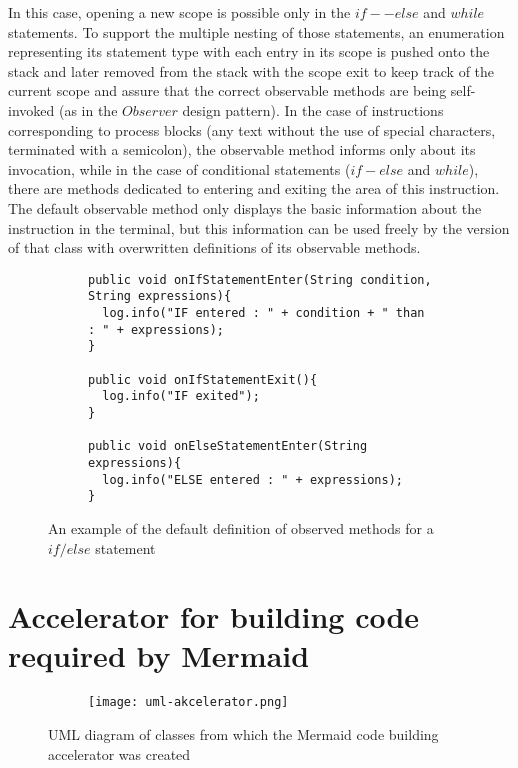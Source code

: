 In this case, opening a new scope is possible only in the $if -- else$ and $while$ statements. To support the multiple nesting of those statements, an enumeration representing its statement type with each entry in its scope is pushed onto the stack and later removed from the stack with the scope exit to keep track of the current scope and assure that the correct observable methods are being self-invoked (as in the $Observer$ design pattern). In the case of instructions corresponding to process blocks (any text without the use of special characters, terminated with a semicolon), the observable method informs only about its invocation, while in the case of conditional statements ($if-else$ and $while$), there are methods dedicated to entering and exiting the area of this instruction. The default observable method only displays the basic information about the instruction in the terminal, but this information can be used freely by the version of that class with overwritten definitions of its observable methods. 
						
\begin{figure}[H]
  \begin{subfigure}{\textwidth}
		\begin{verbatim}
public void onIfStatementEnter(String condition, String expressions){
  log.info("IF entered : " + condition + " than : " + expressions);
}

public void onIfStatementExit(){
  log.info("IF exited");
}

public void onElseStatementEnter(String expressions){
  log.info("ELSE entered : " + expressions);
}
		\end{verbatim}
  \end{subfigure}\hfill
  \caption{An example of the default definition of observed methods for a $if/else$ statement}
\end{figure}



\section{Accelerator for building code required by Mermaid}

\begin{figure}[H]
  \begin{subfigure}{\textwidth}
  	\centering
    \texttt{[image: uml-akcelerator.png]}
  \end{subfigure}\hfill
  \caption{UML diagram of classes from which the Mermaid code building accelerator was created}
\end{figure}

